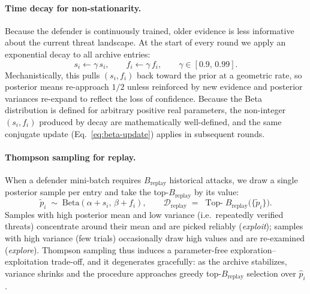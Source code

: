 \paragraph{Time decay for non-stationarity.} Because the defender is continuously trained, older evidence is less informative about the current threat landscape. At the start of every round we apply an exponential decay to all archive entries:
\begin{equation}
  s_i \leftarrow \gamma\,s_i,\qquad f_i \leftarrow \gamma\,f_i,\qquad \gamma \in [0.9,\,0.99].
  \label{eq:time-decay}
\end{equation}
Mechanistically, this pulls $(s_i,f_i)$ back toward the prior at a geometric rate, so posterior means re-approach $1/2$ unless reinforced by new evidence and posterior variances re-expand to reflect the loss of confidence. Because the Beta distribution is defined for arbitrary positive real parameters, the non-integer $(s_i,f_i)$ produced by decay are mathematically well-defined, and the same conjugate update (Eq.~\ref{eq:beta-update}) applies in subsequent rounds.

\paragraph{Thompson sampling for replay.} When a defender mini-batch requires $B_{\mathrm{replay}}$ historical attacks, we draw a single posterior sample per entry and take the top-$B_{\mathrm{replay}}$ by its value:
\begin{equation}
  \tilde p_i \;\sim\; \mathrm{Beta}(\alpha+s_i,\,\beta+f_i),\qquad
  \mathcal{D}_{\mathrm{replay}} \;=\; \operatorname*{Top-}B_{\mathrm{replay}}\bigl(\{\tilde p_i\}\bigr).
  \label{eq:thompson}
\end{equation}
Samples with high posterior mean and low variance (i.e.\ repeatedly verified threats) concentrate around their mean and are picked reliably (\emph{exploit}); samples with high variance (few trials) occasionally draw high values and are re-examined (\emph{explore}). Thompson sampling thus induces a parameter-free exploration--exploitation trade-off, and it degenerates gracefully: as the archive stabilizes, variance shrinks and the procedure approaches greedy top-$B_{\mathrm{replay}}$ selection over $\hat p_i$.

